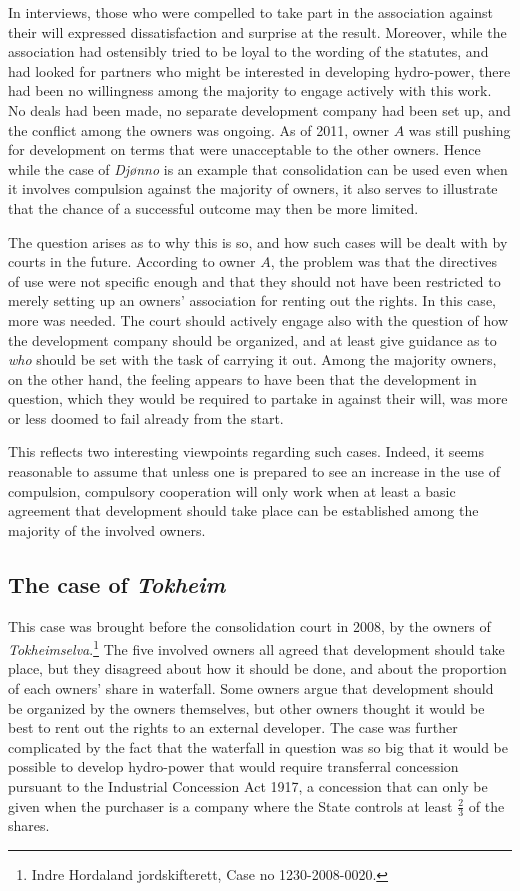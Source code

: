 \documentclass[10pt]{article} %
\begin{document}
In interviews, those who were compelled to take part in the association against their will expressed dissatisfaction and surprise at the result. Moreover, while the association had ostensibly tried to be loyal to the wording of the statutes, and had looked for partners who might be interested in developing hydro-power, there had been no willingness among the majority to engage actively with this work. No deals had been made, no separate development company had been set up, and the conflict among the owners was ongoing. As of 2011, owner $A$ was still pushing for development on terms that were unacceptable to the other owners. Hence while the case of \emph{Djønno} is an example that consolidation can be used even when it involves compulsion against the majority of owners, it also serves to illustrate that the chance of a successful outcome may then be more limited.

The question arises as to why this is so, and how such cases will be dealt with by courts in the future. According to owner $A$, the problem was that the directives of use were not specific enough and that they should not have been restricted to merely setting up an owners' association for renting out the rights. In this case, more was needed. The court should actively engage also with the question of how the development company should be organized, and at least give guidance as to \emph{who} should be set with the task of carrying it out. Among the majority owners, on the other hand, the feeling appears to have been that the development in question, which they would be required to partake in against their will, was more or less doomed to fail already from the start.

This reflects two interesting viewpoints regarding such cases. Indeed, it seems reasonable to assume that unless one is prepared to see an increase in the use of compulsion, compulsory cooperation will only work when at least a basic agreement that development should take place can be established among the majority of the involved owners.

\subsection{The case of \emph{Tokheim}}

This case was brought before the consolidation court in 2008, by the owners of \emph{Tokheimselva}.\footnote{Indre Hordaland jordskifterett, Case no 1230-2008-0020.} The five involved owners all agreed that development should take place, but they disagreed about how it should be done, and about the proportion of each owners' share in waterfall. Some owners argue that development should be organized by the owners themselves, but other owners thought it would be best to rent out the rights to an external developer. The case was further complicated by the fact that the waterfall in question was so big that it would be possible to develop hydro-power that would require transferral concession pursuant to the Industrial Concession Act 1917, a concession that can only be given when the purchaser is a company where the State controls at least $\frac{2}{3}$ of the shares. 
\end{document}
